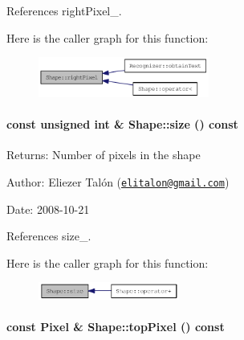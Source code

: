 References rightPixel\_\-.

Here is the caller graph for this function:\nopagebreak
\begin{figure}[H]
\begin{center}
\leavevmode
\includegraphics[width=159pt]{class_shape_c265e43fa90ee2ab7c9cd3a3d1e96d82_icgraph}
\end{center}
\end{figure}
\hypertarget{class_shape_8504d3be338d2fa594c35fe1444a9ed8}{
\paragraph[{size}]{\setlength{\rightskip}{0pt plus 5cm}const unsigned int \& Shape::size () const}\hfill}
\label{class_shape_8504d3be338d2fa594c35fe1444a9ed8}


\begin{Desc}
\item[Returns:]Number of pixels in the shape\end{Desc}
\begin{Desc}
\item[Author:]Eliezer Talón (\href{mailto:elitalon@gmail.com}{\tt elitalon@gmail.com}) \end{Desc}
\begin{Desc}
\item[Date:]2008-10-21 \end{Desc}


References size\_\-.

Here is the caller graph for this function:\nopagebreak
\begin{figure}[H]
\begin{center}
\leavevmode
\includegraphics[width=131pt]{class_shape_8504d3be338d2fa594c35fe1444a9ed8_icgraph}
\end{center}
\end{figure}
\hypertarget{class_shape_063c4934d8c1cd4b02e4e3e4a604f62e}{
\paragraph[{topPixel}]{\setlength{\rightskip}{0pt plus 5cm}const {\bf Pixel} \& Shape::topPixel () const}\hfill}
\label{class_shape_063c4934d8c1cd4b02e4e3e4a604f62e}


